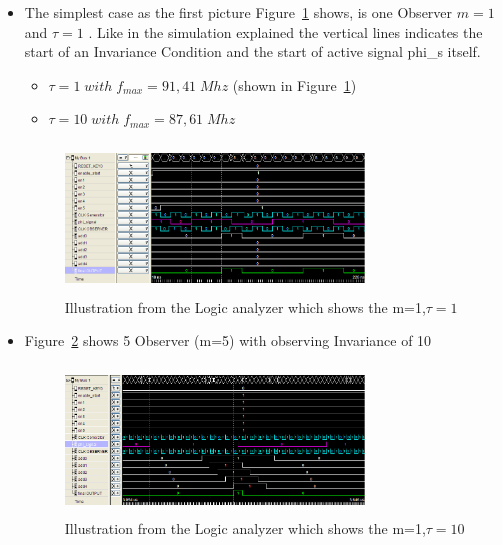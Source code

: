 \begin{itemize}
\item The simplest case as the first picture Figure~\ref{fig:logicanalyzer:m1:t1} shows, is one Observer $m = 1$ and $\tau = 1$ .
Like in the simulation explained the vertical lines indicates the start of an Invariance Condition and the start of active signal phi\_s itself.
 \begin{itemize}
 \item $\tau = 1 \;with\; f_{max}=91,41\;Mhz$ (shown in Figure~\ref{fig:logicanalyzer:m1:t1})
 \item $\tau = 10 \;with\; f_{max}=87,61\;Mhz$ 
\end{itemize}

\begin{figure}[]
\centering
\includegraphics[width=300px,height=150px]{../../pictures/Logicanalyzer/Observer_1_Tau_1.png}
\caption[Logicanalyzer m=1,$\tau=1$]{Illustration from the Logic analyzer which shows the m=1,$\tau = 1$}
\label{fig:logicanalyzer:m1:t1}
\end{figure}



\item Figure~\ref{fig:logicanalyzer:m5:t10} shows 5 Observer (m=5) with observing Invariance of 10\\


\begin{figure}[]
\centering
\includegraphics[width=300px,height=150px]{../../pictures/Logicanalyzer/5_Observer_Tau_10.png}
\caption[Logicanalyzer m=5,$\tau=10$]{Illustration from the Logic analyzer which shows the m=1,$\tau = 10$}
\label{fig:logicanalyzer:m5:t10}
\end{figure}


\end{itemize}
